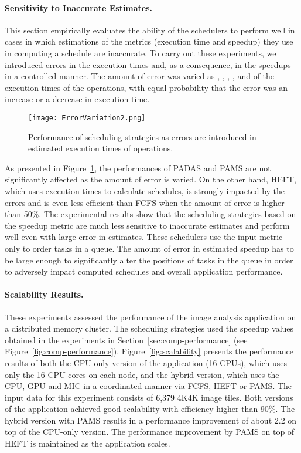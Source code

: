 \paragraph{{\bf Sensitivity to Inaccurate Estimates.}} \label{sec:sensibility}
This section empirically evaluates the ability of the schedulers to perform well
in cases in which estimations of the metrics (execution time and speedup) they 
use in computing a schedule are inaccurate. To carry out these experiments, we
introduced errors in the execution times and, as a consequence, in the
speedups in a controlled manner. The amount of error was varied as 
, , , ,  and  of the execution
times of the operations, with equal probability that the error was an increase 
or a decrease in execution time. 
\begin{figure}[htb!]
	\centering
	\texttt{[image: ErrorVariation2.png]}
	\vspace{-2mm}
	\caption{Performance of scheduling strategies as errors are 
	introduced in estimated execution times of operations.}
	\label{fig:errorVariation}
	\vspace{-2mm}
\end{figure}

As presented in Figure~\ref{fig:errorVariation}, the performances of PADAS and
PAMS are not significantly affected as the amount of error is varied. On the other
hand, HEFT, which uses execution times to calculate schedules, is strongly
impacted by the errors and is even less efficient than FCFS when the amount of 
error is higher 
than 50\%. The experimental results show that the scheduling
strategies based on the speedup metric are much less sensitive to inaccurate 
estimates and perform well even with large error in estimates. 
These schedulers use the input metric only to order tasks in a queue. The amount 
of error in estimated speedup has to be large enough to significantly alter the 
positions of tasks in the queue in order to adversely impact computed schedules 
and overall application performance. 
\paragraph{{\bf Scalability Results.}}
These experiments assessed the performance of the image analysis 
application on a distributed memory cluster. 
The scheduling strategies used the speedup values 
obtained in the experiments in Section~\ref{sec:comp-performance} (see 
Figure~\ref{fig:comp-performance}). 
Figure~\ref{fig:scalability} presents the performance results of both the
CPU-only version of the application (16-CPUs), which uses only the 16 CPU 
cores on each node, and the hybrid version, which uses the CPU, GPU and MIC 
in a coordinated manner via FCFS, HEFT or PAMS. The input data for this 
experiment consists of 6,379 4K4K image tiles. Both versions of the 
application achieved good scalability with efficiency higher than 90\%. 
The hybrid version with PAMS results in a performance improvement of 
about 2.2 on top of the CPU-only version. The performance 
improvement by PAMS on top of HEFT is maintained as the 
application scales.

